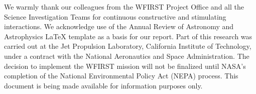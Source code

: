 
We warmly thank our colleagues from the WFIRST Project Office and all the Science Investigation Teams for continuous constructive and stimulating interactions. We acknowledge use of the Annual Review of Astronomy and Astrophysics LaTeX template as a basis for our report. Part of this research was carried out at the Jet Propulsion Laboratory, California Institute of Technology, under a contract with the National Aeronautics and Space Administration. The decision to implement the WFIRST mission will not be finalized until NASA's completion of the National Environmental Policy Act (NEPA) process. This document is being made available for information purposes only.
